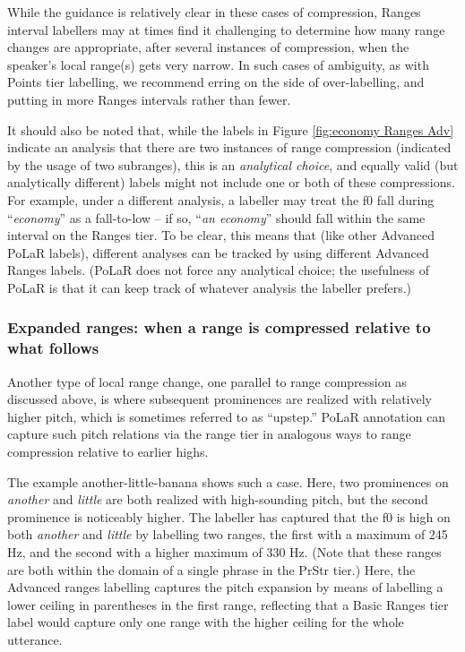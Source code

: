 \documentclass[11pt, twoside]{memoir}
\def\langtext#1{\textit{#1}}
\begin{document}
While the guidance is relatively clear in these cases of compression, Ranges interval labellers may at times find it challenging to determine how many range changes are appropriate, after several instances of compression, when the speaker’s local range(s) gets very narrow. In such cases of ambiguity, as with Points tier labelling, we recommend erring on the side of over-labelling, and putting in more Ranges intervals rather than fewer.

It should also be noted that, while the labels in Figure \ref{fig:economy Ranges Adv} indicate an analysis that there are two instances of range compression (indicated by the usage of two subranges), this is an \emph{analytical choice}, and equally valid (but analytically different) labels might not include one or both of these compressions. For example, under a different analysis, a labeller may treat the f0 fall during “\langtext{economy}” as a fall-to-low – if so, “\langtext{an economy}” should fall within the same interval on the Ranges tier. To be clear, this means that (like other Advanced PoLaR labels), different analyses can be tracked by using different Advanced Ranges labels. (PoLaR does not force any analytical choice; the usefulness of PoLaR is that it can keep track of whatever analysis the labeller prefers.)

\subsubsection{Expanded ranges: when a range is compressed relative to what follows}\label{sec:expanded-ranges-when-a-range-is-compressed-relative-to-what-follows}

Another type of local range change, one parallel to range compression as discussed above, is where subsequent prominences are realized with relatively higher pitch, which is sometimes referred to as “upstep.” PoLaR annotation can capture such pitch relations via the range tier in analogous ways to range compression relative to earlier highs.

The example another-little-banana shows such a case. Here, two prominences on \langtext{another} and \langtext{little} are both realized with high-sounding pitch, but the second prominence is noticeably higher. The labeller has captured that the f0 is high on both \langtext{another} and \langtext{little} by labelling two ranges, the first with a maximum of 245 Hz, and the second with a higher maximum of 330 Hz. (Note that these ranges are both within the domain of a single phrase in the PrStr tier.) Here, the Advanced ranges labelling captures the pitch expansion by means of labelling a lower ceiling in parentheses in the first range, reflecting that a Basic Ranges tier label would capture only one range with the higher ceiling for the whole utterance.
\end{document}
